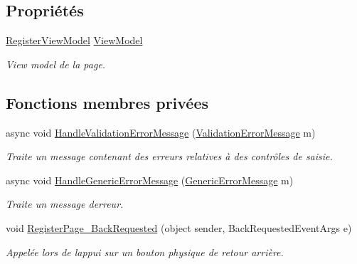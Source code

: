 \subsection*{Propriétés}
\begin{DoxyCompactItemize}
\item 
\hyperlink{class_boxes_1_1_view_models_1_1_register_view_model}{Register\+View\+Model} \hyperlink{class_boxes_1_1_views_1_1_register_page_a90c139d73e9a2abc8ff1909299fce2b1}{View\+Model}
\begin{DoxyCompactList}\small\item\em View model de la page. \end{DoxyCompactList}\end{DoxyCompactItemize}
\subsection*{Fonctions membres privées}
\begin{DoxyCompactItemize}
\item 
async void \hyperlink{class_boxes_1_1_views_1_1_register_page_a59a6156c064b07cf435fa8be6058fe7d}{Handle\+Validation\+Error\+Message} (\hyperlink{class_boxes_1_1_auxiliary_1_1_messaging_1_1_validation_error_message}{Validation\+Error\+Message} m)
\begin{DoxyCompactList}\small\item\em Traite un message contenant des erreurs relatives à des contrôles de saisie. \end{DoxyCompactList}\item 
async void \hyperlink{class_boxes_1_1_views_1_1_register_page_a6810d49be193452feed72349ad9fcff6}{Handle\+Generic\+Error\+Message} (\hyperlink{class_boxes_1_1_auxiliary_1_1_messaging_1_1_generic_error_message}{Generic\+Error\+Message} m)
\begin{DoxyCompactList}\small\item\em Traite un message d\textquotesingle{}erreur. \end{DoxyCompactList}\item 
void \hyperlink{class_boxes_1_1_views_1_1_register_page_a6e16482dc7aa14ff623fb2793e2921c0}{Register\+Page\+\_\+\+Back\+Requested} (object sender, Back\+Requested\+Event\+Args e)
\begin{DoxyCompactList}\small\item\em Appelée lors de l\textquotesingle{}appui sur un bouton physique de retour arrière. \end{DoxyCompactList}\end{DoxyCompactItemize}


